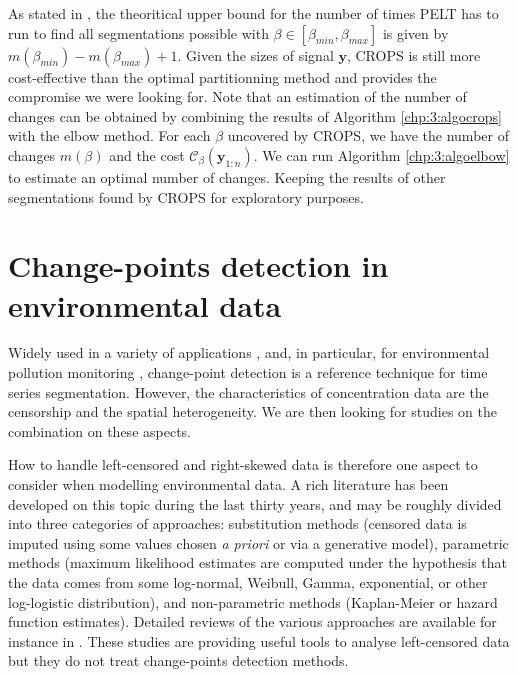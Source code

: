 As stated in \cite{haynes2017}, the theoritical upper bound for the number of times PELT has to run to find all segmentations possible with $\beta\in[\beta_{min},\beta_{max}]$ is given by $m(\beta_{min})-m(\beta_{max})+1$. Given the sizes of signal $\bm y$, CROPS is still more cost-effective than the optimal partitionning method and provides the compromise we were looking for. Note that an estimation of the number of changes can be obtained by combining the results of Algorithm  \ref{chp:3:algocrops} with the elbow method. For each $\beta$ uncovered by CROPS, we have the number of changes $m(\beta)$ and the cost $\mathcal{C}_{\beta}(\bm y_{1:n})$. We can run Algorithm \ref{chp:3:algoelbow} to estimate an optimal number of changes. Keeping the results of other segmentations found by CROPS for exploratory purposes. 

\section{Change-points detection in environmental data}\label{chp:3:4}

Widely used in a variety of applications \citep{basseville1993detection, chen2012parametric, liu2017change, reeves2007review, levy2009detection}, and, in particular, for environmental pollution monitoring \citep{costa2016}, change-point detection is a reference technique for time series segmentation. However, the characteristics of concentration data are the censorship and the spatial heterogeneity. We are then looking for studies on the combination on these aspects.  

How to handle left-censored and right-skewed data is therefore one aspect to consider when modelling environmental data. A rich literature has been developed on this topic during the last thirty years, and may be roughly divided into three categories of approaches: substitution methods (censored data is imputed using some values chosen \emph{a priori} or via a generative model), parametric methods (maximum likelihood estimates are computed under the hypothesis that the data comes from some log-normal, Weibull, Gamma, exponential, or other log-logistic distribution), and non-parametric methods (Kaplan-Meier or hazard function estimates). Detailed reviews of the various approaches are available  for instance in \cite{Authority2010,Hewett2007ACO,Mitra2008,Canales2018,Antweiler2008,Gillespie2010,shoari2018toward}. These studies are providing useful tools to analyse left-censored data but they do not treat change-points detection methods.

